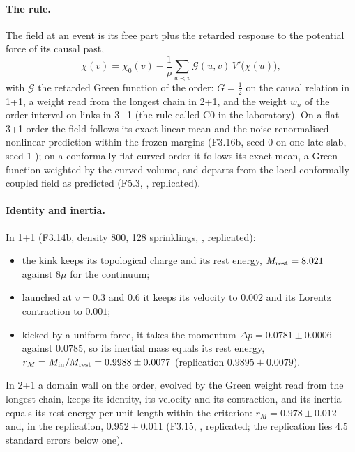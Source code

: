 \paragraph{The rule.} The field at an event is its free part plus the retarded response to the potential force of
its causal past,
\begin{equation}
  \chi(v)=\chi_0(v)-\frac{1}{\rho}\sum_{u\prec v}\mathcal G(u,v)\,V'\bigl(\chi(u)\bigr),
  \label{eq:c0}
\end{equation}
with $\mathcal G$ the retarded Green function of the order: $G=\tfrac12$ on the causal relation in 1+1, a weight read from
the longest chain in 2+1, and the weight $w_n$ of the order-interval on links in 3+1 (the rule called C0 in the
laboratory). On a flat 3+1 order the field follows its exact linear mean and the noise-renormalised nonlinear
prediction within the frozen margins (F3.16b, seed 0  on one late slab, seed 1
); on a conformally flat curved order it follows its exact mean, a Green function weighted by the
curved volume, and departs from the local conformally coupled field as predicted (F5.3, ,
replicated).

\paragraph{Identity and inertia.} In 1+1 (F3.14b, density 800, 128 sprinklings, ,
replicated):
\begin{itemize}
\item the kink keeps its topological charge and its rest energy, $M_{\rm rest}=8.021$ against $8\mu$ for the
  continuum;
\item launched at $v=0.3$ and $0.6$ it keeps its velocity to $0.002$ and its Lorentz contraction to $0.001$;
\item kicked by a uniform force, it takes the momentum $\Delta p=0.0781\pm0.0006$ against $0.0785$, so its
  inertial mass equals its rest energy, $r_M=M_{\rm in}/M_{\rm rest}=0.9988\pm0.0077$ (replication
  $0.9895\pm0.0079$).
\end{itemize}
In 2+1 a domain wall on the order, evolved by the Green weight read from the longest chain, keeps its identity,
its velocity and its contraction, and its inertia equals its rest energy per unit length within the criterion:
$r_M=0.978\pm0.012$ and, in the replication, $0.952\pm0.011$ (F3.15, , replicated; the replication
lies $4.5$ standard errors below one).

